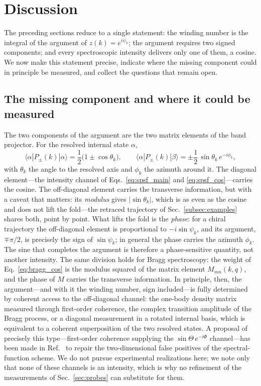 \documentclass[onecolumn,aps,prl,superscriptaddress,longbibliography]{revtex4-2}
\begin{document}
\section{Discussion}\label{sec:discussion}
The preceding sections reduce to a single statement: the winding number is the integral of the argument of $z(k)=e^{i\psi_k}$; the argument requires two signed components; and every spectroscopic intensity delivers only one of them, a cosine. We now make this statement precise, indicate where the missing component could in principle be measured, and collect the questions that remain open.

\subsection{The missing component and where it could be measured}\label{subsec:missing}

The two components of the argument are the two matrix elements of the band projector. For the resolved internal state $\alpha$,
\begin{equation}\label{eq:projector_elements}
  \langle\alpha|P_\pm(k)|\alpha\rangle=\frac12\bigl(1\pm\cos\theta_k\bigr),
  \qquad
  \langle\alpha|P_\pm(k)|\beta\rangle=\pm\frac12\,\sin\theta_k\,e^{-i\phi_k},
\end{equation}
with $\theta_k$ the angle to the resolved axis and $\phi_k$ the azimuth around it. The diagonal element---the intensity channel of Eqs.~\eqref{eq:spsf_main} and \eqref{eq:spsf_cos}---carries the cosine. The off-diagonal element carries the transverse information, but with a caveat that matters: its \emph{modulus} gives $|\sin\theta_k|$, which is as even as the cosine and does not lift the fold---the retraced trajectory of Sec.~\ref{subsec:examples} shares both, point by point. What lifts the fold is the \emph{phase}: for a chiral trajectory the off-diagonal element is proportional to $-i\sin\psi_k$, and its argument, $\mp\pi/2$, is precisely the sign of $\sin\psi_k$; in general the phase carries the azimuth $\phi_k$. The sine that completes the argument is therefore a phase-sensitive quantity, not another intensity. The same division holds for Bragg spectroscopy: the weight of Eq.~\eqref{eq:bragg_cos} is the modulus squared of the matrix element $M_{mn}(k,q)$, and the phase of $M$ carries the transverse information. In principle, then, the argument---and with it the winding number, sign included---is fully determined by coherent access to the off-diagonal channel: the one-body density matrix measured through first-order coherence, the complex transition amplitude of the Bragg process, or a diagonal measurement in a rotated internal basis, which is equivalent to a coherent superposition of the two resolved states. A proposal of precisely this type---first-order coherence supplying the $\sin\Theta\,e^{-i\Phi}$ channel---has been made in Ref.~\cite{estakeRoy2025} to repair the two-dimensional false positives of the spectral-function scheme. We do not pursue experimental realizations here; we note only that none of these channels is an intensity, which is why no refinement of the measurements of Sec.~\ref{sec:probes} can substitute for them.
\end{document}
